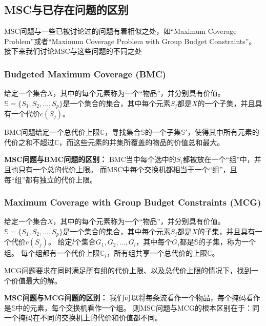 \subsection{MSC与已存在问题的区别}\label{sec:differenceproblem}

MSC问题与一些已被讨论过的问题有着相似之处，如“Maximum Coverage Problem”\cite{khuller1999budgeted}或者“Maximum Coverage Problem with Group Budget Constraints”\cite{chekuri2004maximum}。
接下来我们讨论MSC与这些问题的不同之处

\subsubsection{Budgeted Maximum Coverage (BMC)\cite{khuller1999budgeted}}
给定一个集合$X$，其中的每个元素称为一个“物品”，并分别具有价值。
$\mathds{S}=\{S_1,S_2,...,S_p\}$是一个集合的集合，其中每个元素$S_j$都是$X$的一个子集，并且具有一个代价$c(S_j)$。

BMC问题给定一个总代价上限$\mathds{C} $，寻找集合$\mathds{S}$的一个子集$\mathds{S}'$，使得其中所有元素的代价之和不超过$\mathds{C} $，而这些元素的并集所覆盖的物品的价值总和最大。

\textbf{MSC问题与BMC问题的区别：} 
BMC当中每个选中的$S_i$都被放在一个“组”中，并且也只有一个总的代价上限。
而MSC中每个交换机都相当于一个“组”，且每“组”都有独立的代价上限。


\subsubsection{Maximum Coverage with Group Budget Constraints (MCG)\cite{chekuri2004maximum}}\label{def:mcg}
给定一个集合$X$，其中的每个元素称为一个“物品”，并分别具有价值。
$\mathds{S}=\{S_1,S_2,...,S_p\}$是一个集合的集合，其中每个元素$S_j$都是$X$的子集，并且具有一个代价$c(S_j)$。
给定$l$个集合$G_1,G_2,...,G_l$，其中每个$G_i$都是$\mathds{S}$的子集，称为一个组。
每个组都有一个代价上限$\mathds{C}_i$，所有组共享一个总代价的上限$\mathds{C} $。

MCG问题要求在同时满足所有组的代价上限、以及总代价上限的情况下，找到一个价值最大的解。

\textbf{MSC问题与MCG问题的区别：} 
我们可以将每条流看作一个物品，每个掩码看作是$\mathds{S}$中的元素，每个交换机看作一个组。
则MSC问题与MCG的根本区别在于：同一个掩码在不同的交换机上的代价和价值都不同。
